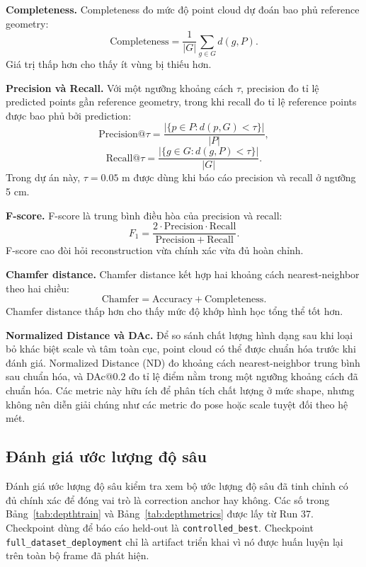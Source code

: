 \documentclass[12pt,a4paper]{article}
\begin{document}
\textbf{Completeness.} Completeness đo mức độ point cloud dự đoán bao phủ reference geometry:
\begin{equation}
\mathrm{Completeness}=\frac{1}{|G|}\sum_{g\in G}d(g,P).
\end{equation}
Giá trị thấp hơn cho thấy ít vùng bị thiếu hơn.

\textbf{Precision và Recall.} Với một ngưỡng khoảng cách $\tau$, precision đo tỉ lệ predicted points gần reference geometry, trong khi recall đo tỉ lệ reference points được bao phủ bởi prediction:
\begin{equation}
\mathrm{Precision@}\tau=\frac{|\{p\in P:d(p,G)<\tau\}|}{|P|},
\end{equation}
\begin{equation}
\mathrm{Recall@}\tau=\frac{|\{g\in G:d(g,P)<\tau\}|}{|G|}.
\end{equation}
Trong dự án này, $\tau=0.05$ m được dùng khi báo cáo precision và recall ở ngưỡng 5 cm.

\textbf{F-score.} F-score là trung bình điều hòa của precision và recall:
\begin{equation}
F_1=\frac{2\cdot\mathrm{Precision}\cdot\mathrm{Recall}}{\mathrm{Precision}+\mathrm{Recall}}.
\end{equation}
F-score cao đòi hỏi reconstruction vừa chính xác vừa đủ hoàn chỉnh.

\textbf{Chamfer distance.} Chamfer distance kết hợp hai khoảng cách nearest-neighbor theo hai chiều:
\begin{equation}
\mathrm{Chamfer}=\mathrm{Accuracy}+\mathrm{Completeness}.
\end{equation}
Chamfer distance thấp hơn cho thấy mức độ khớp hình học tổng thể tốt hơn.

\textbf{Normalized Distance và DAc.} Để so sánh chất lượng hình dạng sau khi loại bỏ khác biệt scale và tâm toàn cục, point cloud có thể được chuẩn hóa trước khi đánh giá. Normalized Distance (ND) đo khoảng cách nearest-neighbor trung bình sau chuẩn hóa, và DAc@$0.2$ đo tỉ lệ điểm nằm trong một ngưỡng khoảng cách đã chuẩn hóa. Các metric này hữu ích để phân tích chất lượng ở mức shape, nhưng không nên diễn giải chúng như các metric đo pose hoặc scale tuyệt đối theo hệ mét.

\subsection{Đánh giá ước lượng độ sâu}
Đánh giá ước lượng độ sâu kiểm tra xem bộ ước lượng độ sâu đã tinh chỉnh có đủ chính xác để đóng vai trò là correction anchor hay không. Các số trong Bảng~\ref{tab:depthtrain} và Bảng~\ref{tab:depthmetrics} được lấy từ Run 37. Checkpoint dùng để báo cáo held-out là \texttt{controlled\_best}. Checkpoint \texttt{full\_dataset\_deployment} chỉ là artifact triển khai vì nó được huấn luyện lại trên toàn bộ frame đã phát hiện.
\end{document}
